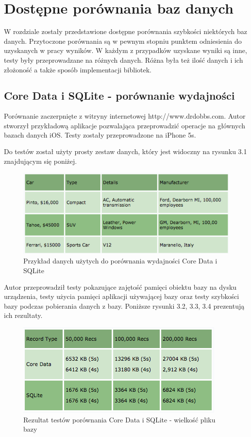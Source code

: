 \section{Dostępne porównania baz danych}

W rozdziale zostały przedstawione dostępne porównania szybkości niektórych baz danych. Przytoczone porównania są w pewnym stopniu punktem odniesienia do uzyskanych w pracy wyników. W każdym z przypadków uzyskane wyniki są inne, testy były przeprowadzane na różnych danych. Różna była też ilość danych i ich złożoność a także sposób implementacji bibliotek. 

\subsection{Core Data i SQLite - porównanie wydajności}

Porównanie zaczerpnięte z witryny internetowej http://www.drdobbs.com. Autor stworzył przykładową aplikacje pozwalająca przeprowadzić operacje na głównych bazach danych iOS. Testy zostały przeprowadzone na iPhone 5s. \par

Do testów został użyty prosty zestaw danych, który jest widoczny na rysunku 3.1 znajdującym się poniżej. 

\begin{figure}[h]
	\includegraphics[width=\linewidth]{img/coredata_sql_test.png}
	\caption{Przykład danych użytych do porównania wydajności Core Data i SQLite}
	\label{fig: CoreData_SQLite_test_data}
\end{figure}

Autor przeprowadził testy pokazujące zajętość pamięci obiektu bazy na dysku urządzenia, testy użycia pamięci aplikacji używającej bazy oraz testy szybkości bazy podczas pobierania danych z bazy. Poniższe rysunki 3.2, 3.3, 3.4 prezentują ich rezultaty.

\begin{figure}
\centering
	\includegraphics{img/drdobbs_storage_test.png}
	\caption{Rezultat testów porównania Core Data i SQLite - wielkość pliku bazy }
	\label{fig: CoreData_SQLite_storage_test}
\end{figure}

